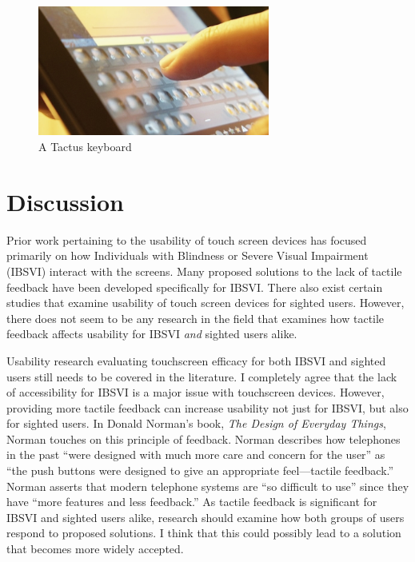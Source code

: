 \documentclass[11pt]{article}
\begin{document}
\begin{figure}[ht]
\centering
\includegraphics[width=3in]{tactus-keyboard.jpg} 
\caption{A Tactus keyboard}
\label{tactus-keyboard}
\end{figure}


\section{Discussion}
Prior work pertaining to the usability of touch screen devices has focused primarily on how Individuals with Blindness or Severe Visual Impairment (IBSVI) interact with the screens. Many proposed solutions to the lack of tactile feedback have been developed specifically for IBSVI. There also exist certain studies that examine usability of touch screen devices for sighted users. \cite{Tinwala:2010:ETE:1868914.1868972} However, there does not seem to be any research in the field that examines how tactile feedback affects usability for IBSVI \textit{and} sighted users alike.

Usability research evaluating touchscreen efficacy for both IBSVI and sighted users still needs to be covered in the literature. I completely agree that the lack of accessibility for IBSVI is a major issue with touchscreen devices. However, providing more tactile feedback can increase usability not just for IBSVI, but also for sighted users. In Donald Norman's book, \textit{The Design of Everyday Things}, Norman touches on this principle of feedback. Norman describes how telephones in the past ``were designed with much more care and concern for the user'' as ``the push buttons were designed to give an appropriate feel---tactile feedback.''\cite{Norman02} Norman asserts that modern telephone systems are ``so difficult to use'' since they have ``more features and less feedback.''\cite{Norman02} As tactile feedback is significant for IBSVI and sighted users alike, research should examine how both groups of users respond to proposed solutions. I think that this could possibly lead to a solution that becomes more widely accepted.
\end{document}

